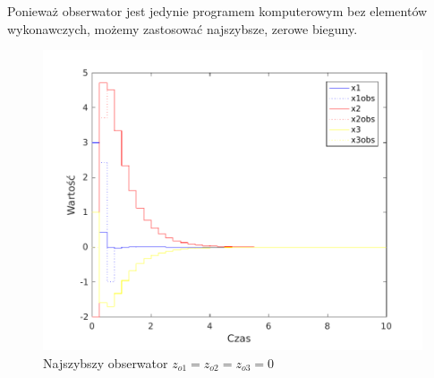 Ponieważ obserwator jest jedynie programem komputerowym bez elementów wykonawczych, możemy zastosować najszybsze, zerowe bieguny.

\begin{figure}[H]
\centering
 \includegraphics[width=\textwidth]{img/obs3.pdf}
\caption{Najszybszy obserwator $z_{o1}=z_{o2}=z_{o3}=0$}
\end{figure}